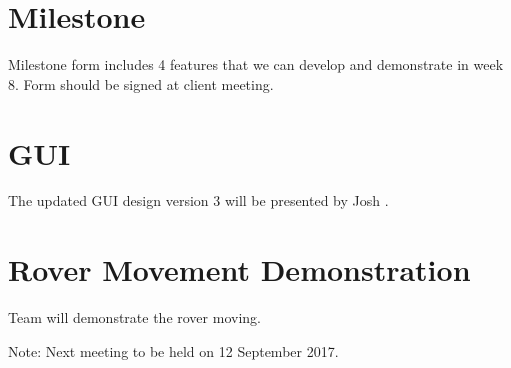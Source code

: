 \documentclass[11pt, a4paper]{article}
\begin{document}
  \section{ Milestone }
Milestone form includes 4 features that we can develop and demonstrate in week 8. Form should be signed at client meeting.

  \section{ GUI }
The updated GUI design version 3 will be presented by Josh . 

  \section{ Rover Movement Demonstration}
Team will demonstrate the rover moving.  

  \vspace*{10pt}
  \noindent Note: Next meeting to be held on 12 September 2017.


  
\end{document}
